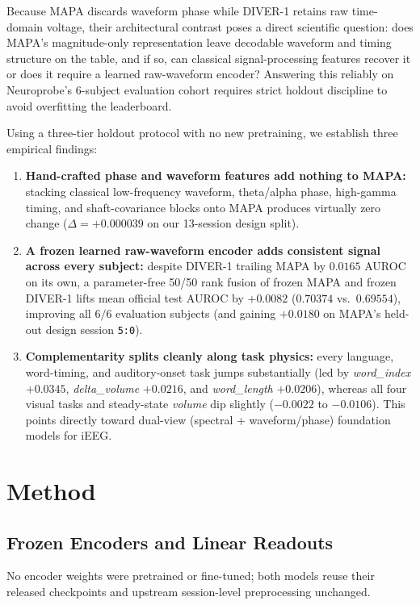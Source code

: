 \documentclass[11pt]{article}
\begin{document}
Because MAPA discards waveform phase while DIVER-1 retains raw time-domain voltage, their architectural contrast poses a direct scientific question: does MAPA's magnitude-only representation leave decodable waveform and timing structure on the table, and if so, can classical signal-processing features recover it or does it require a learned raw-waveform encoder? Answering this reliably on Neuroprobe's 6-subject evaluation cohort requires strict holdout discipline to avoid overfitting the leaderboard.

Using a three-tier holdout protocol with no new pretraining, we establish three empirical findings:
\begin{enumerate}\setlength{\itemsep}{2pt}\setlength{\parskip}{0pt}
\item \textbf{Hand-crafted phase and waveform features add nothing to MAPA:} stacking classical low-frequency waveform, theta/alpha phase, high-gamma timing, and shaft-covariance blocks onto MAPA produces virtually zero change ($\Delta=+0.000039$ on our 13-session design split).
\item \textbf{A frozen learned raw-waveform encoder adds consistent signal across every subject:} despite DIVER-1 trailing MAPA by $0.0165$ AUROC on its own, a parameter-free 50/50 rank fusion of frozen MAPA and frozen DIVER-1 lifts mean official test AUROC by $+0.0082$ ($0.70374$ vs.\ $0.69554$), improving all $6/6$ evaluation subjects (and gaining $+0.0180$ on MAPA's held-out design session \texttt{5:0}).
\item \textbf{Complementarity splits cleanly along task physics:} every language, word-timing, and auditory-onset task jumps substantially (led by \emph{word\_index} $+0.0345$, \emph{delta\_volume} $+0.0216$, and \emph{word\_length} $+0.0206$), whereas all four visual tasks and steady-state \emph{volume} dip slightly ($-0.0022$ to $-0.0106$). This points directly toward dual-view (spectral + waveform/phase) foundation models for iEEG.
\end{enumerate}

\section{Method}

\subsection{Frozen Encoders and Linear Readouts}\label{sec:encoders}
No encoder weights were pretrained or fine-tuned; both models reuse their released checkpoints and upstream session-level preprocessing unchanged.
\end{document}
